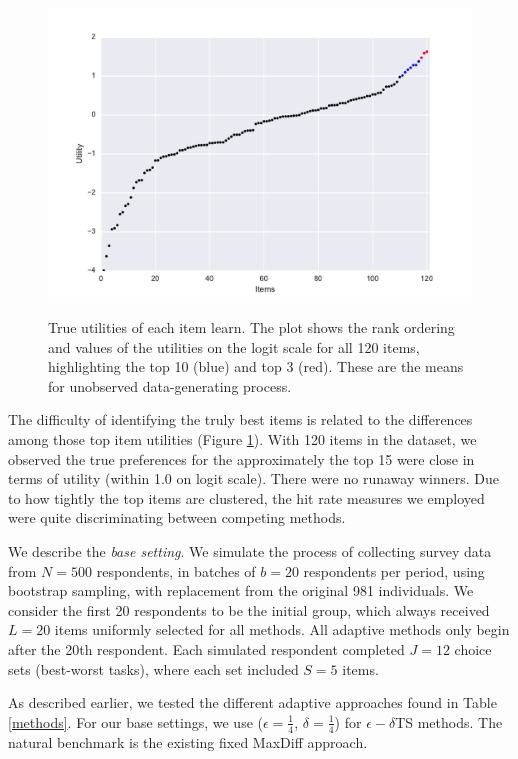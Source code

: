 \documentclass[a4paper,12pt]{article}
\newcommand{\numperset}{L}
\begin{document}
\begin{figure}[!ht]
\caption{True utilities of each item learn. The plot shows the rank ordering and values of the utilities on the logit scale for all 120 items, highlighting the top 10 (blue) and top 3 (red). These are the means for unobserved data-generating process.}
\includegraphics[width=1\textwidth]{plots/utilscore.pdf}
\label{fig:util} 
\end{figure}

The difficulty of identifying the truly best items is related to the differences among those top item utilities (Figure \ref{fig:util}). With 120 items in the dataset, we observed the true preferences for the approximately the top 15 were close in terms of utility (within 1.0 on logit scale). There were no runaway winners. Due to how tightly the top items are clustered, the hit rate measures we employed were quite discriminating between competing methods.

We describe the \emph{base setting}. We simulate the process of collecting survey data from $N=500$ respondents, in batches of $b=20$ respondents per period, using bootstrap sampling, with replacement from the original 981 individuals. We consider the first 20 respondents to be the initial group, which always received $\numperset=20$ items uniformly selected for all methods. All adaptive methods only begin after the 20th respondent. Each simulated respondent completed $J=12$ choice sets (best-worst tasks), where each set included $S=5$ items.

As described earlier, we tested the different adaptive approaches found in Table \ref{methods}. For our base settings, we use ($\epsilon=\frac{1}{4}$, $\delta=\frac{1}{4}$) for $\epsilon-\delta$TS methods. The natural benchmark is the existing fixed MaxDiff approach.
\end{document}
